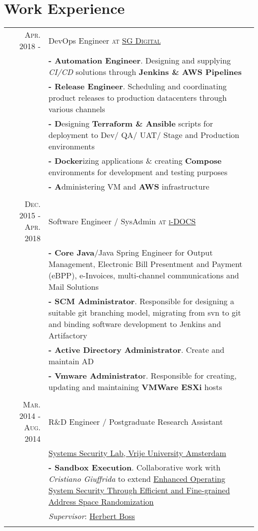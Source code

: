 \documentclass[a4paper,10pt]{article} %
\begin{document}
\section{Work Experience}
\begin{tabular}{r|p{}}

\textsc{Apr. 2018 - } & {\large DevOps Engineer \textsc{at \href{https://www.sgdigital.com/}{SG Digital}}} \\
& \textbf{- Automation Engineer}. Designing and supplying \emph{CI/CD} solutions through \textbf{Jenkins \& AWS Pipelines}  \\
& \textbf{- Release Engineer}. Scheduling and coordinating product releases to production datacenters through various channels \\
& \textbf{- D}esigning \textbf{Terraform \& Ansible} scripts for deployment to Dev/ QA/ UAT/ Stage and Production environments \\
& \textbf{- Docker}izing applications \& creating \textbf{Compose} environments for development and testing purposes \\
& \textbf{- A}dministering VM and \textbf{AWS} infrastructure \\
\multicolumn{2}{c}{} \\

\textsc{Dec. 2015 - Apr. 2018} & {\large Software Engineer / SysAdmin \textsc{at \href{https://www.i-docs.com/}{i-DOCS}}} \\
& \textbf{- Core Java}/Java Spring Engineer for Output Management, Electronic Bill Presentment and Payment (eBPP), e-Invoices,  multi-channel communications and Mail Solutions \\
& \textbf{- SCM Administrator}. Responsible for designing a suitable git branching model, migrating from svn to git and binding software development to Jenkins and Artifactory \\
& \textbf{- Active Directory Administrator}. Create and maintain AD \\
& \textbf{- Vmware Administrato}r. Responsible for creating, updating and maintaining \textbf{VMWare ESXi} hosts\\
\multicolumn{2}{c}{} \\

\textsc{Mar. 2014 - Aug. 2014} & {\large R\&D Engineer / Postgraduate Research Assistant} \\
&  {\large \href{https://www.vusec.net/}{Systems Security Lab, Vrije University Amsterdam}} \\
& \textbf{- Sandbox Execution}. Collaborative work with \emph{Cristiano Giuffrida} to extend \href {https://www.usenix.org/conference/usenixsecurity12/technical-sessions/presentation/giuffrida}{Enhanced Operating System Security Through Efficient and Fine-grained Address Space Randomization}  \\
& \emph{Supervisor}: \href{https://www.cs.vu.nl/~herbertb/}{Herbert Boss} \\
\multicolumn{2}{c}{} \\


\end{tabular}
\end{document}
